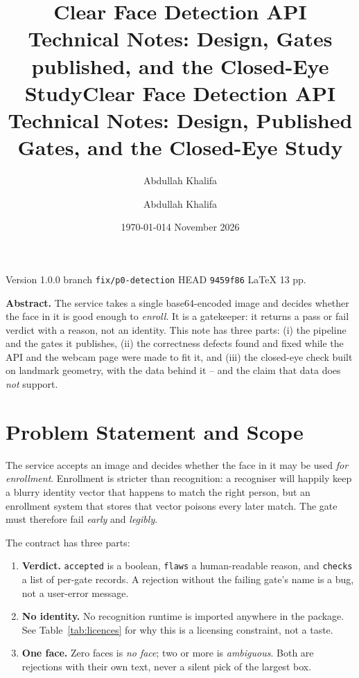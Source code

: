 \documentclass[11pt,a4paper]{article}
\title{\vspace{-1.6cm}\textbf{Clear Face Detection API}\\[4pt]
  \large Technical Notes: Design, Gates published, and the Closed-Eye Study}
\author{Abdullah Khalifa}
\date{\today}
\newcommand{\coden}[1]{\texttt{\small #1}}
\begin{document}
\title{\vspace{-1.2cm}\textbf{Clear Face Detection API}\\[4pt]
  \large Technical Notes: Design, Published Gates, and the
  Closed-Eye Study}
\author{Abdullah Khalifa}
\date{4 November 2026}
\maketitle

\vspace{-6pt}
\begin{center}
\color{soft}\small
Version 1.0.0 \textbar{} branch \coden{fix/p0-detection} \textbar{} HEAD
\coden{9459f86} \textbar{} LaTeX 13 pp.
\end{center}

\begin{keybox}
\textbf{Abstract.} The service takes a single base64-encoded image and
decides whether the face in it is good enough to \emph{enroll}. It is a
gatekeeper: it returns a pass or fail verdict with a reason, not an
identity. This note has three parts: (i) the pipeline and the gates it
publishes, (ii) the correctness defects found and fixed while the API
and the webcam page were made to fit it, and (iii) the closed-eye check
built on landmark geometry, with the data behind it -- and the claim
that data does \emph{not} support.
\end{keybox}

\tableofcontents
\newpage
\section{Problem Statement and Scope}

The service accepts an image and decides whether the face in it may be
used \emph{for enrollment}. Enrollment is stricter than recognition: a
recogniser will happily keep a blurry identity vector that happens to
match the right person, but an enrollment system that stores that vector
poisons every later match. The gate must therefore fail \emph{early} and
\emph{legibly}.

The contract has three parts:

\begin{enumerate}
  \item \textbf{Verdict.} \coden{accepted} is a boolean, \coden{flaws} a
        human-readable reason, and \coden{checks} a list of per-gate
        records. A rejection without the failing gate's name is a bug,
        not a user-error message.
  \item \textbf{No identity.} No recognition runtime is imported
        anywhere in the package. See Table~\ref{tab:licences} for why
        this is a licensing constraint, not a taste.
  \item \textbf{One face.} Zero faces is \emph{no face}; two or more is
        \emph{ambiguous}. Both are rejections with their own text, never
        a silent pick of the largest box.
\end{enumerate}
\end{document}
